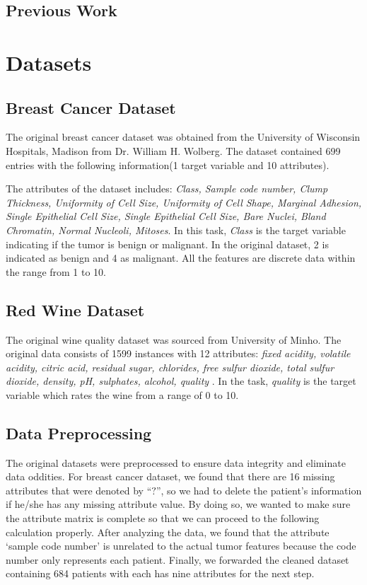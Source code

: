 \documentclass[%
 aps,
 amsmath,amssymb,
 reprint,%
 twocolumn
]{revtex4-1}
\begin{document}
\subsection*{Previous Work}


\section{\label{sec:level1}Datasets}
\subsection*{\label{sec:level2}Breast Cancer Dataset}
The original breast cancer dataset was obtained from the University of Wisconsin Hospitals, Madison from Dr. William H. Wolberg. The dataset contained 699 entries with the following information(1 target variable and 10 attributes). \par

The attributes of the dataset includes: \textit{Class, Sample code number, Clump Thickness, Uniformity of Cell Size, Uniformity of Cell Shape, Marginal Adhesion, Single Epithelial Cell Size, Single Epithelial Cell Size, Bare Nuclei, Bland Chromatin, Normal Nucleoli, Mitoses}. In this task, \textit{Class} is the target variable indicating if the tumor is benign or malignant. In the original dataset, 2 is indicated as benign and 4 as malignant. All the features are discrete data within the range from 1 to 10. 

\subsection*{Red Wine Dataset}
The original wine quality dataset was sourced from University of Minho. The original data consists of 1599 instances with 12 attributes: \textit{fixed acidity, volatile acidity, citric acid, residual sugar, chlorides, free sulfur dioxide, total sulfur dioxide, density, pH, sulphates, alcohol, quality
}. In the task, \textit{quality} is the target variable which rates the wine from a range of 0 to 10. 

\subsection*{Data Preprocessing}
The original datasets were preprocessed to ensure data integrity and eliminate data oddities. For breast cancer dataset, we found that there are 16 missing attributes that were denoted by “$?$”, so we had to delete the patient’s information if he/she has any missing attribute value. By doing so, we wanted to make sure the attribute matrix is complete so that we can proceed to the following calculation properly. After analyzing the data, we found that the attribute ‘sample code number’ is unrelated to the actual tumor features because the code number only represents each patient. Finally, we forwarded the cleaned dataset containing 684 patients with each has nine attributes for the next step. \par
\end{document}
